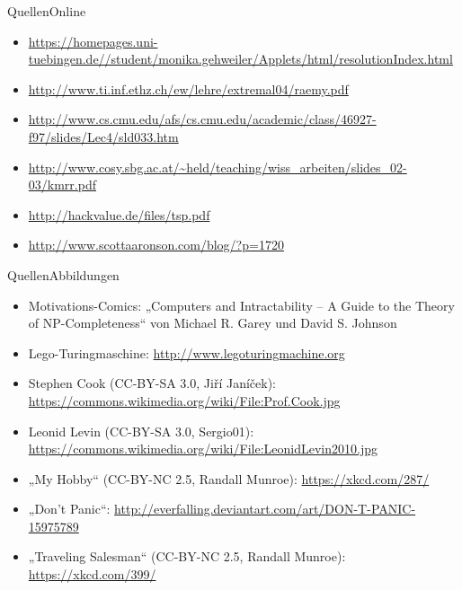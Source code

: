 \documentclass[ignorenonframetext,]{beamer}
\begin{document}
\begin{frame}{Quellen}{Online}
\begin{itemize}
	\item \url{https://homepages.uni-tuebingen.de//student/monika.gehweiler/Applets/html/resolutionIndex.html}
	\item \url{http://www.ti.inf.ethz.ch/ew/lehre/extremal04/raemy.pdf}
	\item \url{http://www.cs.cmu.edu/afs/cs.cmu.edu/academic/class/46927-f97/slides/Lec4/sld033.htm}
	\item \url{http://www.cosy.sbg.ac.at/~held/teaching/wiss\_arbeiten/slides\_02-03/kmrr.pdf}
	\item \url{http://hackvalue.de/files/tsp.pdf}
	\item \url{http://www.scottaaronson.com/blog/?p=1720}
\end{itemize}
\end{frame}

\begin{frame}{Quellen}{Abbildungen}
\begin{itemize}
	\item Motivations-Comics: „Computers and Intractability -- A Guide to the Theory of NP-Completeness“ von Michael R. Garey und David S. Johnson
	\item Lego-Turingmaschine: \url{http://www.legoturingmachine.org}
	\item Stephen Cook (CC-BY-SA 3.0, Jiří Janíček):
		\url{https://commons.wikimedia.org/wiki/File:Prof.Cook.jpg}
	\item Leonid Levin (CC-BY-SA 3.0, Sergio01):
		\url{https://commons.wikimedia.org/wiki/File:LeonidLevin2010.jpg}
	\item „My Hobby“ (CC-BY-NC 2.5, Randall Munroe): \url{https://xkcd.com/287/}
	\item „Don't Panic“: \url{http://everfalling.deviantart.com/art/DON-T-PANIC-15975789}
	\item „Traveling Salesman“ (CC-BY-NC 2.5, Randall Munroe): \url{https://xkcd.com/399/}
\end{itemize}
\end{frame}
\end{document}
